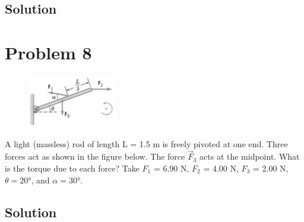 \documentclass[12pt]{article}
\begin{document}
\subsection*{Solution}


\pagebreak
\section*{Problem 8}
\begin{figure}
    \vspace{-30pt}
    \includegraphics[width=0.35\textwidth]{graph_8.png} 
\end{figure}
A light (massless) rod of length L = 1.5 m is freely pivoted at one end. Three forces act as
shown in the figure below. The force $\vec{F}_3$ acts at the midpoint. What is the torque due to each force?
Take $F_1$ = 6.90 N, $F_2$ = 4.00 N, $F_3$ = 2.00 N, $\theta = 20\unit{\degree}$, and $\alpha = 30\unit{\degree}$.

\subsection*{Solution}
 
\end{document}
